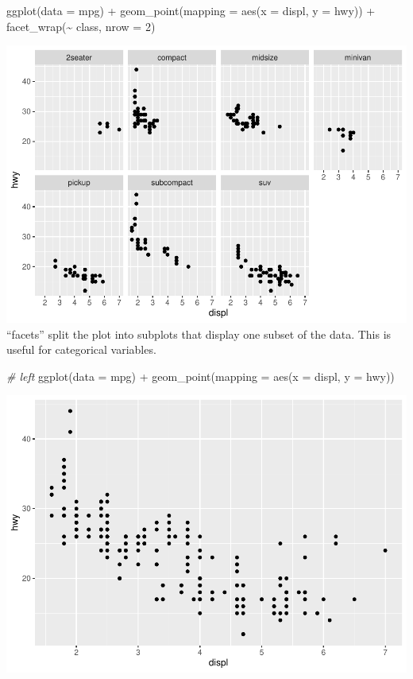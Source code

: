 \documentclass[
]{article}
\newenvironment{Shaded}{\begin{snugshade}}{\end{snugshade}}
\newcommand{\AttributeTok}[1]{\textcolor[rgb]{0.77,0.63,0.00}{#1}}
\newcommand{\CommentTok}[1]{\textcolor[rgb]{0.56,0.35,0.01}{\textit{#1}}}
\newcommand{\DecValTok}[1]{\textcolor[rgb]{0.00,0.00,0.81}{#1}}
\newcommand{\FunctionTok}[1]{\textcolor[rgb]{0.00,0.00,0.00}{#1}}
\newcommand{\NormalTok}[1]{#1}
\newcommand{\SpecialCharTok}[1]{\textcolor[rgb]{0.00,0.00,0.00}{#1}}
\begin{document}
\begin{Shaded}
\begin{Highlighting}[]
\FunctionTok{ggplot}\NormalTok{(}\AttributeTok{data =}\NormalTok{ mpg) }\SpecialCharTok{+} 
  \FunctionTok{geom\_point}\NormalTok{(}\AttributeTok{mapping =} \FunctionTok{aes}\NormalTok{(}\AttributeTok{x =}\NormalTok{ displ, }\AttributeTok{y =}\NormalTok{ hwy)) }\SpecialCharTok{+} 
  \FunctionTok{facet\_wrap}\NormalTok{(}\SpecialCharTok{\textasciitilde{}}\NormalTok{ class, }\AttributeTok{nrow =} \DecValTok{2}\NormalTok{)}
\end{Highlighting}
\end{Shaded}

\includegraphics{Assignments_files/figure-latex/unnamed-chunk-41-1.pdf}
``facets'' split the plot into subplots that display one subset of the
data. This is useful for categorical variables.

\begin{Shaded}
\begin{Highlighting}[]
\CommentTok{\# left}
\FunctionTok{ggplot}\NormalTok{(}\AttributeTok{data =}\NormalTok{ mpg) }\SpecialCharTok{+} 
  \FunctionTok{geom\_point}\NormalTok{(}\AttributeTok{mapping =} \FunctionTok{aes}\NormalTok{(}\AttributeTok{x =}\NormalTok{ displ, }\AttributeTok{y =}\NormalTok{ hwy))}
\end{Highlighting}
\end{Shaded}

\includegraphics{Assignments_files/figure-latex/unnamed-chunk-42-1.pdf}
\end{document}
